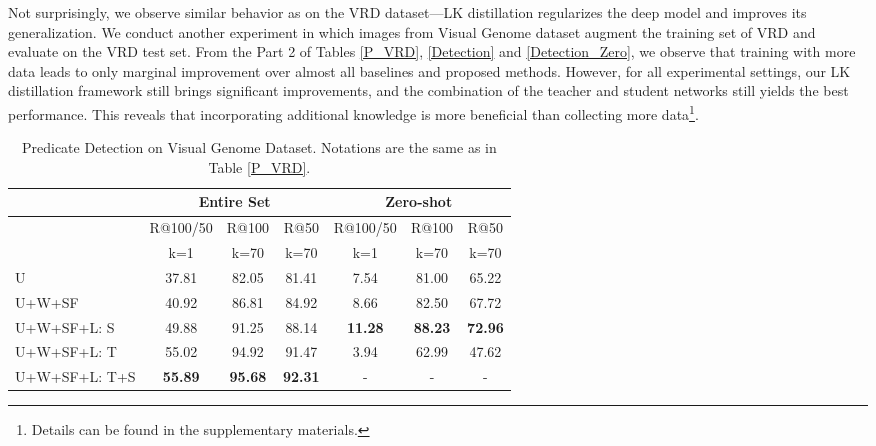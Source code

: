 Not surprisingly, we observe similar behavior as on the VRD dataset---LK distillation regularizes the deep model and improves its generalization. We conduct another experiment in which images from Visual Genome dataset augment the training set of VRD and evaluate on the VRD test set. From the Part 2 of Tables \ref{P_VRD}, \ref{Detection} and \ref{Detection_Zero}, we observe that training with more data leads to only marginal improvement over almost all baselines and proposed methods. However, for all experimental settings, our LK distillation framework still brings significant improvements, and the combination of the teacher and student networks still yields the best performance. This reveals that incorporating additional knowledge is more beneficial than collecting more data\footnote{Details can be found in the supplementary materials.}. 

\begin{table}[t]
\centering
\scriptsize
\setlength{\tabcolsep}{3.6pt} 
\caption{Predicate Detection on Visual Genome Dataset. Notations are the same as in Table \ref{P_VRD}.}
\label{VG}
\begin{tabular}{@{}lccc|ccc@{}}
\toprule
\multicolumn{1}{c}{} & \multicolumn{3}{c}{Entire Set} & \multicolumn{3}{c}{Zero-shot} \\ \midrule
\multicolumn{1}{c}{} & R@100/50     & R@100    & R@50     & R@100/50     & R@100    & R@50    \\
\multicolumn{1}{c}{} & k=1      & k=70      & k=70     & k=1      & k=70      & k=70    \\\midrule
U                    & 37.81    & 82.05    & 81.41    & 7.54     & 81.00    & 65.22   \\
U+W+SF               & 40.92    & 86.81    & 84.92    & 8.66     & 82.50    & 67.72   \\
U+W+SF+L: S         & 49.88    & 91.25    & 88.14    & \textbf{11.28}    & \textbf{88.23}    & \textbf{72.96}   \\
U+W+SF+L: T         & 55.02    & 94.92    & 91.47    & 3.94     & 62.99    & 47.62   \\
U+W+SF+L: T+S       & \textbf{55.89}    & \textbf{95.68}    & \textbf{92.31}    & -        & -        & -       \\ \bottomrule
\end{tabular}
\end{table}


